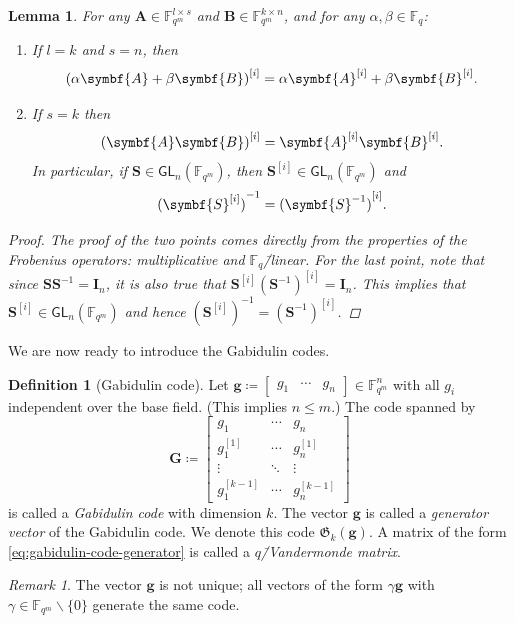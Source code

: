 \documentclass[version=last, paper=A4, parskip=half, oneside,%
toc=bibliography, toc=listof, listof=leveldown]{scrbook}
\theoremstyle{plain}
\newtheorem{lemma}{Lemma}
\theoremstyle{definition}
\newtheorem{definition}{Definition}
\theoremstyle{remark}
\newtheorem*{remark}{Remark}
\renewcommand*{\vec}{\symbf}
\newcommand*{\mat}{\symbf}
\newcommand*{\GL}{\ensuremath{\mathsf{GL}}}
\newcommand*{\FF}{\ensuremath{\mathbb{F}}}
\newcommand*{\Gab}{\ensuremath{\mathfrak{G}}}
\begin{document}
\begin{lemma}\label{lem:frobenius-automorphism-properties}
  For any \(\mat{A} \in \FF_{q^m}^{l \times s}\) and
  \(\mat{B} \in \FF_{q^m}^{k \times n}\), and for any
  \(\alpha, \beta \in \FF_q\):
  \begin{enumerate}
  \item If \(l = k\) and \(s = n\), then
    \[
      {(\alpha \mat{A} + \beta \mat{B})}^{[i]} = \alpha \mat{A}^{[i]} + \beta \mat{B}^{[i]}\text.
    \]
  \item If \(s = k\) then
    \[
      {(\mat{A} \mat{B})}^{[i]} = \mat{A}^{[i]} \mat{B}^{[i]}\text.
    \]
    In particular, if \(\mat{S} \in \GL_n(\FF_{q^m})\), then
    \(\mat{S}^{[i]} \in \GL_n(\FF_{q^m})\) and
    \[
      {(\mat{S}^{[i]})}^{-1} = {(\mat{S}^{-1})}^{[i]}\text.
    \]
  \end{enumerate}
  \begin{proof}
    The proof of the two points comes directly from the properties of the
    Frobenius operators: multiplicative and \(\FF_q\)\=/linear.  For the last
    point, note that since \(\mat{S} \mat{S}^{-1} = \mat{I}_n\), it is also true
    that \(\mat{S}^{[i]} {(\mat{S}^{-1})}^{[i]} = \mat{I}_n\).  This implies
    that \(\mat{S}^{[i]} \in \GL_n(\FF_{q^m})\) and hence
    \({(\mat{S}^{[i]})}^{-1} = {(\mat{S}^{-1})}^{[i]}\).
  \end{proof}
\end{lemma}

We are now ready to introduce the Gabidulin codes.

\begin{definition}[Gabidulin code]
  Let
  \(\vec{g} \coloneqq \begin{bmatrix} g_1 & \cdots & g_n \end{bmatrix} \in \FF_{q^m}^n\)
  with all \(g_i\) independent over the base field.  (This implies \(n \le m\).)
  The code spanned by
  \begin{equation}\label{eq:gabidulin-code-generator}
    \mat{G} \coloneqq
    \begin{bmatrix}
      g_1 & \cdots & g_n \\
      g_1^{[1]} & \cdots & g_n^{[1]} \\
      \vdots & \ddots & \vdots \\
      g_1^{[k - 1]} & \cdots & g_n^{[k - 1]}
    \end{bmatrix}
  \end{equation}
  is called a \emph{Gabidulin code} with dimension \(k\).  The vector
  \(\vec{g}\) is called a \emph{generator vector} of the Gabidulin code.  We
  denote this code \(\Gab_k(\vec{g})\).  A matrix of the form
  \cref{eq:gabidulin-code-generator} is called a \emph{\(q\)\=/Vandermonde
    matrix}.
  \begin{remark}
    The vector \(\vec{g}\) is not unique; all vectors of the form
    \(\gamma \vec{g}\) with \(\gamma \in \FF_{q^m} \smallsetminus \{0\}\)
    generate the same code.
  \end{remark}
\end{definition}
\end{document}

